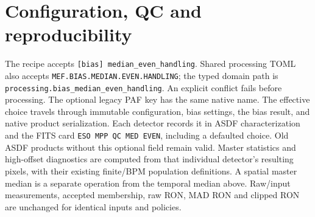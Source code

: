 \documentclass[11pt]{article}
\begin{document}
\section{Configuration, QC and reproducibility}
The recipe accepts \texttt{[bias] median\_even\_handling}. Shared processing
TOML also accepts \texttt{MEF.BIAS.MEDIAN.EVEN.HANDLING}; the typed domain
path is \nolinkurl{processing.bias_median_even_handling}. An explicit
conflict fails before processing. The optional legacy PAF key has the same
native name. The effective choice travels through immutable configuration,
bias settings, the bias result, and native product serialization.
Each detector records it in ASDF characterization and the FITS card
\texttt{ESO MPP QC MED EVEN}, including a defaulted choice. Old ASDF products
without this optional field remain valid.
Master statistics and high-offset diagnostics are computed from that
individual detector's resulting pixels, with their existing finite/BPM
population definitions. A spatial master median is a separate operation from
the temporal median above. Raw/input measurements, accepted membership, raw
RON, MAD RON and clipped RON are unchanged for identical inputs and policies.
\end{document}
